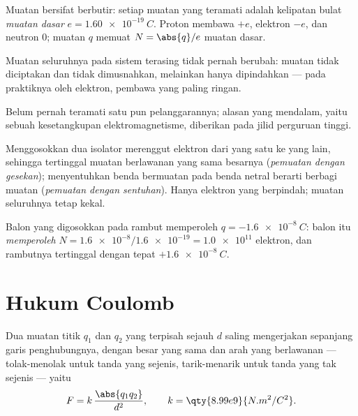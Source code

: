 \begin{definition}\label{def:g11:fundamental-interactions:elementary}
Muatan bersifat berbutir: setiap muatan yang teramati adalah kelipatan
bulat \emph{muatan dasar}
$e = \qty{1.60e-19}{C}$. Proton membawa $+e$, elektron $-e$, dan neutron
$0$; muatan $q$ memuat $N = \abs{q}/e$ muatan dasar.
\end{definition}

\begin{proposition}\label{prop:g11:fundamental-interactions:conservation}
Muatan seluruhnya pada sistem terasing tidak pernah berubah: muatan
tidak diciptakan dan tidak dimusnahkan, melainkan hanya dipindahkan ---
pada praktiknya oleh elektron, pembawa yang paling ringan.
\end{proposition}
\admitted

\begin{remark}\label{rem:g11:fundamental-interactions:conservation}
Belum pernah teramati satu pun pelanggarannya; alasan yang mendalam,
yaitu sebuah kesetangkupan elektromagnetisme, diberikan pada jilid
perguruan tinggi.
\end{remark}

\begin{definition}\label{def:g11:fundamental-interactions:charging}
Menggosokkan dua isolator merenggut elektron dari yang satu ke yang
lain, sehingga tertinggal muatan berlawanan yang sama besarnya
(\emph{pemuatan dengan gesekan});
menyentuhkan benda bermuatan pada benda netral berarti berbagi muatan
(\emph{pemuatan dengan sentuhan}). Hanya
elektron yang berpindah; muatan seluruhnya tetap kekal.
\end{definition}

\begin{example}\label{ex:g11:fundamental-interactions:balloon}
Balon yang digosokkan pada rambut memperoleh $q = \qty{-1.6e-8}{C}$:
balon itu \emph{memperoleh} $N = \num{1.6e-8} / \num{1.6e-19} = \num{1.0e11}$ elektron, dan rambutnya tertinggal dengan tepat
$+\qty{1.6e-8}{C}$.
\end{example}

\section{Hukum Coulomb}

\begin{theorem}\label{thm:g11:fundamental-interactions:coulomb}
Dua muatan titik $q_1$ dan $q_2$ yang terpisah sejauh $d$ saling
mengerjakan  sepanjang garis penghubungnya, dengan besar yang sama
dan arah yang berlawanan --- tolak-menolak untuk tanda yang sejenis,
tarik-menarik untuk tanda yang tak sejenis --- yaitu
\[
F = k\,\frac{\abs{q_1 q_2}}{d^{2}},
\qquad k = \qty{8.99e9}{N.m^2/C^2}.
\]
\end{theorem}
\admitted

